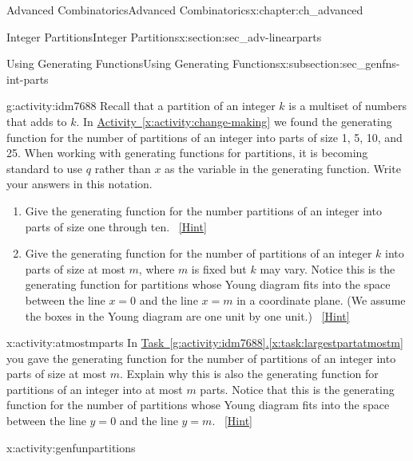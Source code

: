 \documentclass[oneside,10pt,]{book}
\numberwithin{equation}{chapter}
\begin{document}
\begin{chapterptx}{Advanced Combinatorics}{}{Advanced Combinatorics}{}{}{x:chapter:ch_advanced}
\begin{sectionptx}{Integer Partitions}{}{Integer Partitions}{}{}{x:section:sec_adv-linearparts}
\begin{subsectionptx}{Using Generating Functions}{}{Using Generating Functions}{}{}{x:subsection:sec_genfns-int-parts}
\begin{activity}{}{g:activity:idm7688}%
Recall that a partition of an integer \(k\) is a multiset of numbers that adds to \(k\). In \hyperref[x:activity:change-making]{Activity~\ref{x:activity:change-making}} we found the generating function for the number of partitions of an integer into parts of size 1, 5, 10, and 25. When working with generating functions for partitions, it is becoming standard to use \(q\) rather than \(x\) as the variable in the generating function.  Write your answers in this notation.\footnotemark{}%
\begin{enumerate}[font=\bfseries,label=(\alph*),ref=\alph*]
\item{}Give the generating function for the number partitions of an integer into parts of size one through ten.%
\qquad~\hfill{\tiny\hyperlink{g:hint:idm7701-back}{[Hint]}}\item\label{x:task:largestpartatmostm}Give the generating function for the number of partitions of an integer \(k\) into parts of size at most \(m\), where \(m\) is fixed but \(k\) may vary. Notice this is the generating function for partitions whose Young diagram fits into the space between the line \(x=0\) and the line \(x=m\) in a coordinate plane. (We assume the boxes in the Young diagram are one unit by one unit.)%
\qquad~\hfill{\tiny\hyperlink{g:hint:idm7715-back}{[Hint]}}\end{enumerate}
\end{activity}
%
\begin{activity}{}{x:activity:atmostmparts}%
In \hyperref[x:task:largestpartatmostm]{Task~\ref{g:activity:idm7688}.\ref{x:task:largestpartatmostm}} you gave the generating function for the number of partitions of an integer into parts of size at most \(m\). Explain why this is also the generating function for partitions of an integer into at most \(m\) parts. Notice that this is the generating function for the number of partitions whose Young diagram fits into the space between the line \(y=0\) and the line \(y=m\).%
\qquad~\hfill{\tiny\hyperlink{g:hint:idm7729-back}{[Hint]}}\end{activity}
\begin{activity}{}{x:activity:genfunpartitions}%

\end{activity}
\end{subsectionptx}
\end{sectionptx}
\end{chapterptx}
\end{document}
